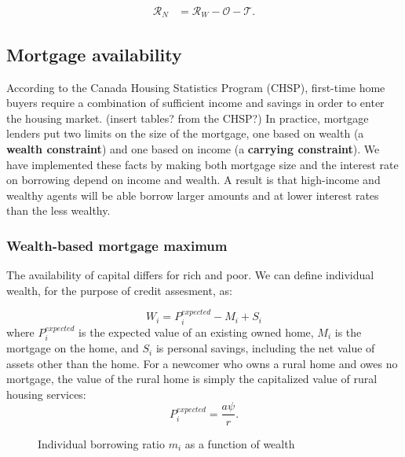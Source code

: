 \begin{align}
\mathcal{R}_N &= \mathcal{R}_W - \mathcal{O} - \mathcal{T}.
\end{align}

 {\color{black}

\subsection{Mortgage availability} \label{sec:mortgage-availability}
According to the Canada Housing Statistics Program (CHSP), first-time home buyers require a combination of sufficient income and savings in order to enter the housing market. (insert tables? from the CHSP?) In practice, mortgage lenders put two  limits on the size of the mortgage, one based on wealth (a \textbf{wealth constraint}) and one based on income (a \textbf{carrying constraint}). We have implemented these facts by making both mortgage size and the interest rate on borrowing  depend on income and wealth. A result is that high-income and  wealthy agents will be able borrow larger amounts and at lower interest rates than the less wealthy.



\subsubsection{Wealth-based mortgage maximum} 
The availability of capital differs for rich and poor. 
We can define individual wealth, for the purpose of credit assesment, as:

\begin{equation} 
W_i= P^{expected}_i - M_i  +S_i 
\end{equation}
where $P^{expected}_i$ is the expected value of an existing owned home, $M_i$ is the mortgage on the home, and $S_i$ is personal savings, including the net value of assets other than the home. %
For a newcomer who owns a rural home and owes no mortgage, the value of the rural home is simply the capitalized value of rural housing services:
\begin{equation} 
P^{expected}_i = \frac{a\psi}{r}.
\end{equation}


    \begin{figure}[htb]
    \begin{center}
    
    \end{center}
    \caption{Individual borrowing ratio $m_i$ as a function of wealth}
    \label{fig-borrowing-ratio}
    \end{figure}


}
